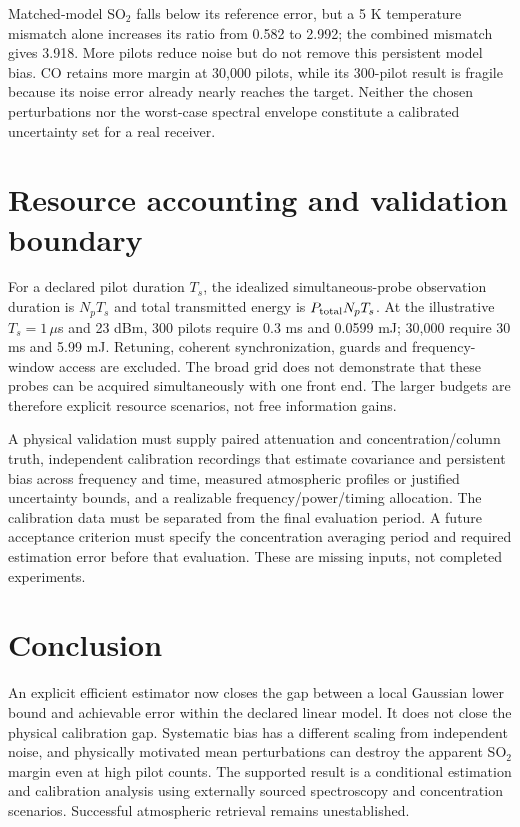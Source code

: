 \documentclass[conference]{IEEEtran}
\begin{document}
Matched-model SO$_2$ falls below its reference error, but a 5 K temperature mismatch alone increases its ratio from 0.582 to 2.992; the combined mismatch gives 3.918. More pilots reduce noise but do not remove this persistent model bias. CO retains more margin at 30,000 pilots, while its 300-pilot result is fragile because its noise error already nearly reaches the target. Neither the chosen perturbations nor the worst-case spectral envelope constitute a calibrated uncertainty set for a real receiver.



\section{Resource accounting and validation boundary}
For a declared pilot duration $T_s$, the idealized simultaneous-probe observation duration is $N_pT_s$ and total transmitted energy is $P_{\rm total}N_pT_s$. At the illustrative $T_s=1\,\mu$s and 23 dBm, 300 pilots require 0.3 ms and 0.0599 mJ; 30,000 require 30 ms and 5.99 mJ. Retuning, coherent synchronization, guards and frequency-window access are excluded. The broad grid does not demonstrate that these probes can be acquired simultaneously with one front end. The larger budgets are therefore explicit resource scenarios, not free information gains.

A physical validation must supply paired attenuation and concentration/column truth, independent calibration recordings that estimate covariance and persistent bias across frequency and time, measured atmospheric profiles or justified uncertainty bounds, and a realizable frequency/power/timing allocation. The calibration data must be separated from the final evaluation period. A future acceptance criterion must specify the concentration averaging period and required estimation error before that evaluation. These are missing inputs, not completed experiments.

\section{Conclusion}
An explicit efficient estimator now closes the gap between a local Gaussian lower bound and achievable error within the declared linear model. It does not close the physical calibration gap. Systematic bias has a different scaling from independent noise, and physically motivated mean perturbations can destroy the apparent SO$_2$ margin even at high pilot counts. The supported result is a conditional estimation and calibration analysis using externally sourced spectroscopy and concentration scenarios. Successful atmospheric retrieval remains unestablished.
\end{document}
